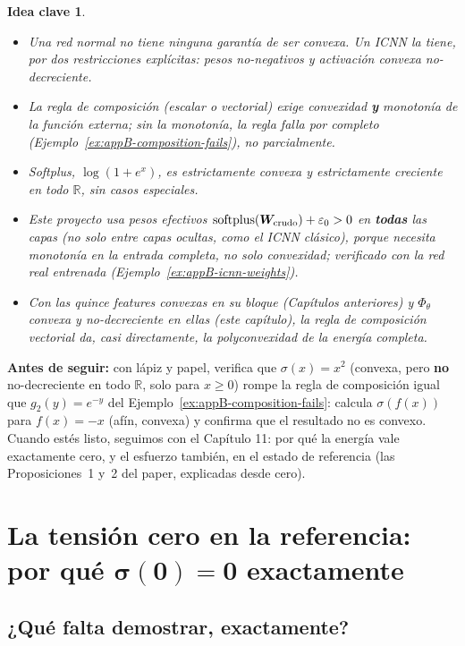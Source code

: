 \documentclass[11pt,a4paper]{article}
\newtheorem{takeaway}{Idea clave}
\newcommand{\R}{\mathbb{R}}
\begin{document}
\begin{takeaway}
\begin{itemize}
\item Una red normal no tiene ninguna garant\'ia de ser convexa. Un ICNN
la tiene, por dos restricciones expl\'icitas: pesos no-negativos y
activaci\'on convexa no-decreciente.
\item La regla de composici\'on (escalar o vectorial) exige convexidad
\textbf{y} monoton\'ia de la funci\'on externa; sin la monoton\'ia, la
regla falla por completo (Ejemplo~\ref{ex:appB-composition-fails}), no
parcialmente.
\item Softplus, $\log(1+e^x)$, es estrictamente convexa y estrictamente
creciente en todo $\R$, sin casos especiales.
\item Este proyecto usa pesos efectivos $\mathrm{softplus}(\bm W_{\rm
crudo})+\varepsilon_0>0$ en \textbf{todas} las capas (no solo entre
capas ocultas, como el ICNN cl\'asico), porque necesita monoton\'ia en
la entrada completa, no solo convexidad; verificado con la red real
entrenada (Ejemplo~\ref{ex:appB-icnn-weights}).
\item Con las quince features convexas en su bloque (Cap\'itulos
anteriores) y $\Phi_\theta$ convexa y no-decreciente en ellas (este
cap\'itulo), la regla de composici\'on vectorial da, casi directamente,
la polyconvexidad de la energ\'ia completa.
\end{itemize}
\end{takeaway}

\bigskip
\noindent\textbf{Antes de seguir:} con l\'apiz y papel, verifica que
$\sigma(x)=x^2$ (convexa, pero \textbf{no} no-decreciente en todo $\R$,
solo para $x\geq0$) rompe la regla de composici\'on igual que
$g_2(y)=e^{-y}$ del Ejemplo~\ref{ex:appB-composition-fails}: calcula
$\sigma(f(x))$ para $f(x)=-x$ (af\'in, convexa) y confirma que el
resultado no es convexo. Cuando est\'es listo, seguimos con el
Cap\'itulo 11: por qu\'e la energ\'ia vale exactamente cero, y el
esfuerzo tambi\'en, en el estado de referencia (las
Proposiciones~1 y~2 del paper, explicadas desde cero).

\section{La tensi\'on cero en la referencia: por qu\'e $\bm\sigma(\bm0)=\bm0$ exactamente}
\label{ch:zero-stress}

\subsection{¿Qu\'e falta demostrar, exactamente?}
\end{document}
